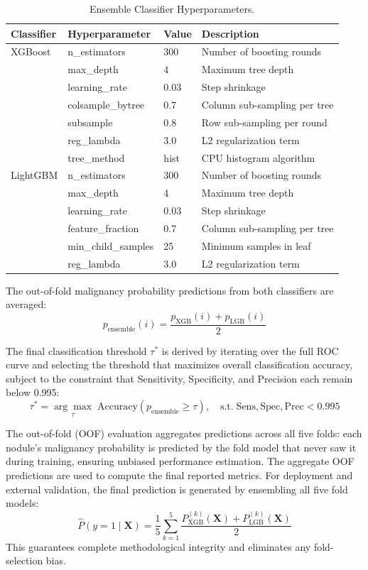 \documentclass{iopjournal}
\begin{document}
\begin{table}[h]
\centering
\caption{Ensemble Classifier Hyperparameters.}\label{tab:hyperparams}
\begin{tabular}{llll}
\toprule
\textbf{Classifier} & \textbf{Hyperparameter} & \textbf{Value} &
\textbf{Description} \\
\midrule
XGBoost & n\_estimators & 300 & Number of boosting rounds \\
        & max\_depth & 4 & Maximum tree depth \\
        & learning\_rate & 0.03 & Step shrinkage \\
        & colsample\_bytree & 0.7 & Column sub-sampling per tree \\
        & subsample & 0.8 & Row sub-sampling per round \\
        & reg\_lambda & 3.0 & L2 regularization term \\
        & tree\_method & hist & CPU histogram algorithm \\
\midrule
LightGBM & n\_estimators & 300 & Number of boosting rounds \\
         & max\_depth & 4 & Maximum tree depth \\
         & learning\_rate & 0.03 & Step shrinkage \\
         & feature\_fraction & 0.7 & Column sub-sampling per tree \\
         & min\_child\_samples & 25 & Minimum samples in leaf \\
         & reg\_lambda & 3.0 & L2 regularization term \\
\bottomrule
\end{tabular}
\end{table}

The out-of-fold malignancy probability predictions from both classifiers are
averaged:
\[
p_{\mathrm{ensemble}}(i) = \frac{p_{\mathrm{XGB}}(i)+p_{\mathrm{LGB}}(i)}{2}
\]

The final classification threshold $\tau^*$ is derived by iterating over the
full ROC curve and selecting the threshold that maximizes overall classification
accuracy, subject to the constraint that Sensitivity, Specificity, and Precision
each remain below 0.995:
\[
\tau^* = \underset{\tau}{\arg\max}\;\mathrm{Accuracy}(p_{\mathrm{ensemble}}
\geq\tau), \quad \mathrm{s.t.}\;\mathrm{Sens},\mathrm{Spec},\mathrm{Prec}<0.995
\]

The out-of-fold (OOF) evaluation aggregates predictions across all five folds:
each nodule's malignancy probability is predicted by the fold model that never
saw it during training, ensuring unbiased performance estimation. The aggregate
OOF predictions are used to compute the final reported metrics. For deployment
and external validation, the final prediction is generated by ensembling all
five fold models:
\[
\hat{P}(y=1 \mid \mathbf{X}) = \frac{1}{5}\sum_{k=1}^{5}
\frac{P^{(k)}_{\mathrm{XGB}}(\mathbf{X})+P^{(k)}_{\mathrm{LGB}}(\mathbf{X})}{2}
\]
This guarantees complete methodological integrity and eliminates any
fold-selection bias.
\end{document}
